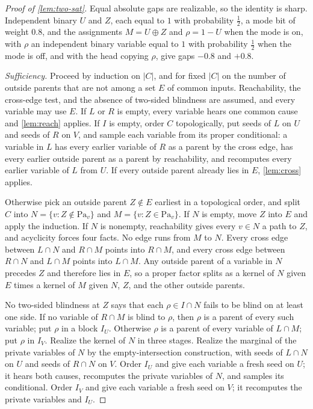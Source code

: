 \begin{proof}[Proof of \cref{lem:two-sat}]
Equal absolute gaps are realizable, so the identity is sharp. Independent binary $U$ and $Z$, each equal to $1$ with probability $\tfrac12$, a mode bit of weight $0.8$, and the assignments $M=U\oplus Z$ and $\rho=1-U$ when the mode is on, with $\rho$ an independent binary variable equal to $1$ with probability $\tfrac12$ when the mode is off, and with the head copying $\rho$, give gaps $-0.8$ and $+0.8$.

\emph{Sufficiency.} Proceed by induction on $|C|$, and for fixed $|C|$ on the number of outside parents that are not among a set $E$ of common inputs. Reachability, the cross-edge test, and the absence of two-sided blindness are assumed, and every variable may use $E$. If $L$ or $R$ is empty, every variable hears one common cause and \cref{lem:reach} applies. If $I$ is empty, order $C$ topologically, put seeds of $L$ on $U$ and seeds of $R$ on $V$, and sample each variable from its proper conditional: a variable in $L$ has every earlier variable of $R$ as a parent by the cross edge, has every earlier outside parent as a parent by reachability, and recomputes every earlier variable of $L$ from $U$. If every outside parent already lies in $E$, \cref{lem:cross} applies.

Otherwise pick an outside parent $Z\notin E$ earliest in a topological order, and split $C$ into $N=\{v:Z\notin\mathrm{Pa}_v\}$ and $M=\{v:Z\in\mathrm{Pa}_v\}$. If $N$ is empty, move $Z$ into $E$ and apply the induction. If $N$ is nonempty, reachability gives every $v\in N$ a path to $Z$, and acyclicity forces four facts. No edge runs from $M$ to $N$. Every cross edge between $L\cap N$ and $R\cap M$ points into $R\cap M$, and every cross edge between $R\cap N$ and $L\cap M$ points into $L\cap M$. Any outside parent of a variable in $N$ precedes $Z$ and therefore lies in $E$, so a proper factor splits as a kernel of $N$ given $E$ times a kernel of $M$ given $N$, $Z$, and the other outside parents.

No two-sided blindness at $Z$ says that each $\rho\in I\cap N$ fails to be blind on at least one side. If no variable of $R\cap M$ is blind to $\rho$, then $\rho$ is a parent of every such variable; put $\rho$ in a block $I_U$. Otherwise $\rho$ is a parent of every variable of $L\cap M$; put $\rho$ in $I_V$. Realize the kernel of $N$ in three stages. Realize the marginal of the private variables of $N$ by the empty-intersection construction, with seeds of $L\cap N$ on $U$ and seeds of $R\cap N$ on $V$. Order $I_U$ and give each variable a fresh seed on $U$; it hears both causes, recomputes the private variables of $N$, and samples its conditional. Order $I_V$ and give each variable a fresh seed on $V$; it recomputes the private variables and $I_U$.


\end{proof}
